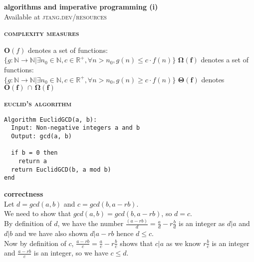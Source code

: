\documentclass[a4paper]{article}
\begin{document}
	
\begin{center}
	\huge{\textbf{algorithms and imperative programming (i)}}\\
	\small{Available at \textsc{jtang.dev/resources}}\\
\end{center}
\begin{multicols}{2}

\begin{framed}
	\begin{center}
		\textbf{\textsc{complexity measures}}
	\end{center}
	\textbf{O$(f)$} denotes a set of functions:\\
	$\{g:\mathbb{N} \rightarrow \mathbb{N} \vert \exists n_0 \in \mathbb{N}, c \in \mathbb{R}^+, \forall n > n_0, g(n) \leq c \cdot f(n) \}$
	\textbf{$\bm{\Omega(f)}$} denotes a set of functions:\\
	$\{g:\mathbb{N} \rightarrow \mathbb{N} \vert \exists n_0 \in \mathbb{N}, c \in \mathbb{R}^+, \forall n > n_0, g(n) \geq c \cdot f(n) \}$
	\textbf{$\bm{\Theta(f)}$} denotes $\bm{O(f) \, \cap \, \Omega(f)}$
\end{framed}

\begin{framed}
	\begin{center}
		\textbf{\textsc{euclid's algorithm}}
	\end{center}
\begin{lstlisting}
Algorithm EuclidGCD(a, b):
  Input: Non-negative integers a and b
  Output: gcd(a, b)
		
  if b = 0 then
    return a
  return EuclidGCD(b, a mod b)
end
\end{lstlisting}

\noindent
\textbf{correctness}\\
Let $d = gcd(a, b)$ and $c = gcd(b, a - rb)$. \\
We need to show that $gcd(a, b) = gcd(b, a - rb)$, so $d = c$.\\
By definition of $d$, we have the number $\frac{(a - rb)}{d} = \frac{a}{d} - r\frac{b}{d}$ is an integer as $d \vert a$ and $d \vert b$ and we have also shown $d \vert a - rb$ hence $d \leq c$.\\
Now by definition of $c$, $\frac{a - rb}{c} = \frac{a}{c} - r\frac{b}{c}$ shows that $c \vert a$ as we know $r\frac{b}{c}$ is an integer and $\frac{a - rb}{c}$ is an integer, so we have $c \leq d$.\\


\end{framed}
\end{multicols}
\end{document}
